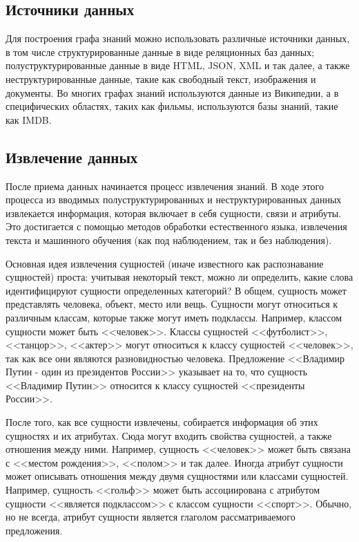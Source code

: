 \subsection{Источники данных}

Для построения графа знаний можно использовать различные источники данных, в том числе структурированные данные в виде реляционных баз
данных; полуструктурированные данные в виде HTML, JSON, XML и так далее, а также неструктурированные данные, такие как свободный текст,
изображения и документы. Во многих графах знаний используются данные из Википедии, а в специфических областях, таких как фильмы,
используются базы знаний, такие как IMDB.

\subsection{Извлечение данных}

После приема данных начинается процесс извлечения знаний. В ходе этого процесса из вводимых полуструктурированных и неструктурированных
данных извлекается информация, которая включает в себя сущности, связи и атрибуты. Это достигается с помощью методов обработки естественного
языка, извлечения текста и машинного обучения (как под наблюдением, так и без наблюдения).

Основная идея извлечения сущностей (иначе известного как распознавание сущностей) проста: учитывая некоторый текст, можно ли определить,
какие слова идентифицируют сущности определенных категорий? В общем, сущность может представлять человека, объект, место или вещь. Сущности
могут относиться к различным классам, которые также могут иметь подклассы. Например, классом сущности может быть <<человек>>. Классы сущностей
<<футболист>>, <<танцор>>, <<актер>> могут относиться к классу сущностей <<человек>>, так как все они являются разновидностью человека. Предложение
<<Владимир Путин - один из президентов России>> указывает на то, что сущность <<Владимир Путин>> относится к классу сущностей <<президенты России>>.

После того, как все сущности извлечены, собирается информация об этих сущностях и их атрибутах. Сюда могут входить свойства сущностей, а
также отношения между ними. Например, сущность <<человек>> может быть связана с <<местом рождения>>, <<полом>> и так далее. Иногда атрибут сущности
может описывать отношения между двумя сущностями или классами сущностей. Например, сущность <<гольф>> может быть ассоциирована с атрибутом
сущности <<является подклассом>> с классом сущности <<спорт>>. Обычно, но не всегда, атрибут сущности является глаголом рассматриваемого предложения.

